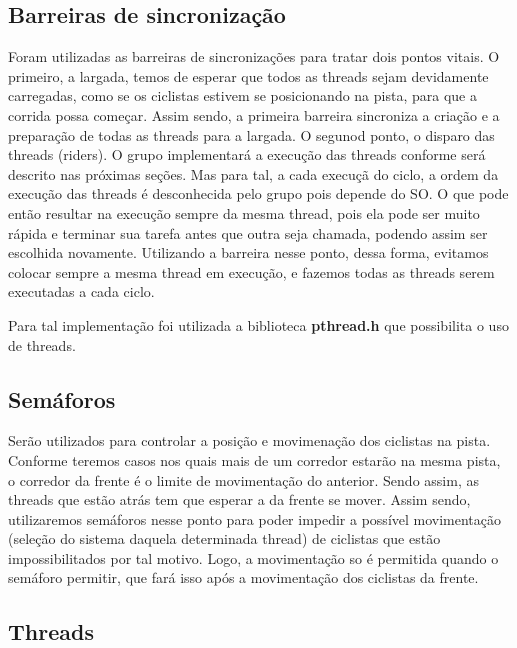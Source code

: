 \documentclass[12pt,a4paper]{article}
\begin{document}
\subsection{Barreiras de sincronização}

    Foram utilizadas as barreiras de sincronizações para tratar dois pontos vitais. 
    O primeiro, a largada, temos de esperar que todos as threads sejam devidamente carregadas, como se os ciclistas estivem se posicionando na pista, para que a corrida possa começar. Assim sendo, a primeira barreira sincroniza a criação e a preparação de todas as threads para a largada.
    O segunod ponto, o disparo das threads (riders). O grupo implementará a execução das threads conforme será descrito nas próximas seções. Mas para tal, a cada execuçã do ciclo, a ordem da execução das threads é desconhecida pelo grupo pois depende do SO. O que pode então resultar na execução sempre da mesma thread, pois ela pode ser muito rápida e terminar sua tarefa antes que outra seja chamada, podendo assim ser escolhida novamente. Utilizando a barreira nesse ponto, dessa forma, evitamos colocar sempre a mesma thread em execução, e fazemos todas as threads serem executadas a cada ciclo.

    Para tal implementação foi utilizada a biblioteca \textbf{pthread.h} que possibilita o uso de threads.


\subsection{Semáforos}

    Serão utilizados para controlar a posição e movimenação dos ciclistas na pista.
    Conforme teremos casos nos quais mais de um corredor estarão na mesma pista, o corredor da frente é o limite de movimentação do anterior. Sendo assim, as threads que estão atrás tem que esperar a da frente se mover. Assim sendo, utilizaremos semáforos nesse ponto para poder impedir a possível movimentação (seleção do sistema daquela determinada thread) de ciclistas que estão impossibilitados por tal motivo. Logo, a movimentação so é permitida quando o semáforo permitir, que fará isso após a movimentação dos ciclistas da frente. 

\subsection{Threads}
\end{document}
